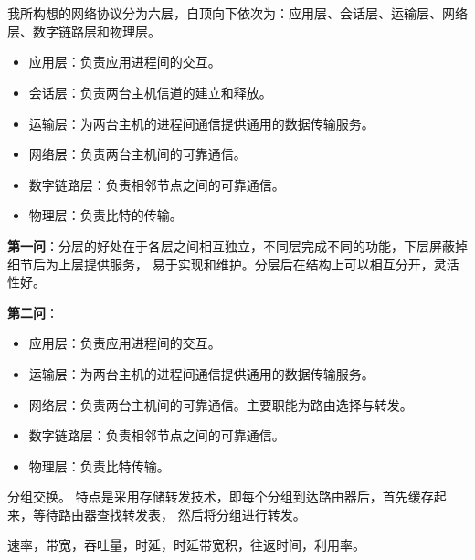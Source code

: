 \documentclass{ctexart}
\newcounter{answercnt}
\newcommand{\sCourse}{计算机网络}   %
\newcommand{\nTime}{1}             %
\newcommand{\sName}{黄昊}           %
\newcommand{\sNumber}{20204205}     %
\begin{document}
    \setcounter{answercnt}{0}
    \begin{center}
        \\
        \fontsize{13pt}{0}{\textit{\kaishu\sName\qquad\sNumber}}\\
    \end{center}


我所构想的网络协议分为六层，自顶向下依次为：应用层、会话层、运输层、网络层、数字链路层和物理层。

\begin{itemize}
    \item 应用层：负责应用进程间的交互。
    \item 会话层：负责两台主机信道的建立和释放。
    \item 运输层：为两台主机的进程间通信提供通用的数据传输服务。
    \item 网络层：负责两台主机间的可靠通信。
    \item 数字链路层：负责相邻节点之间的可靠通信。
    \item 物理层：负责比特的传输。
\end{itemize}


\textbf{第一问}：分层的好处在于各层之间相互独立，不同层完成不同的功能，下层屏蔽掉细节后为上层提供服务，
易于实现和维护。分层后在结构上可以相互分开，灵活性好。

\textbf{第二问}：
\begin{itemize}
    \item 应用层：负责应用进程间的交互。
    \item 运输层：为两台主机的进程间通信提供通用的数据传输服务。
    \item 网络层：负责两台主机间的可靠通信。主要职能为路由选择与转发。
    \item 数字链路层：负责相邻节点之间的可靠通信。
    \item 物理层：负责比特传输。
\end{itemize}

分组交换。
特点是采用存储转发技术，即每个分组到达路由器后，首先缓存起来，等待路由器查找转发表，
然后将分组进行转发。

速率，带宽，吞吐量，时延，时延带宽积，往返时间，利用率。
\end{document}
